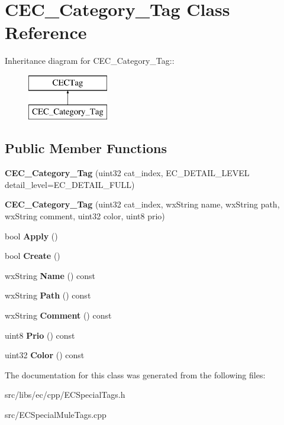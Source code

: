 \section{CEC\_\-Category\_\-Tag Class Reference}
\label{classCEC__Category__Tag}
Inheritance diagram for CEC\_\-Category\_\-Tag::\begin{figure}[H]
\begin{center}
\leavevmode
\includegraphics[height=2cm]{classCEC__Category__Tag}
\end{center}
\end{figure}
\subsection*{Public Member Functions}
\begin{DoxyCompactItemize}
\item 
{\bfseries CEC\_\-Category\_\-Tag} (uint32 cat\_\-index, EC\_\-DETAIL\_\-LEVEL detail\_\-level=EC\_\-DETAIL\_\-FULL)\label{classCEC__Category__Tag_a904f086f05f0ac6d945e6345faf9133e}

\item 
{\bfseries CEC\_\-Category\_\-Tag} (uint32 cat\_\-index, wxString name, wxString path, wxString comment, uint32 color, uint8 prio)\label{classCEC__Category__Tag_a2769cfc61a8cf20475986d538178af71}

\item 
bool {\bfseries Apply} ()\label{classCEC__Category__Tag_aa9d9e45e6d0c7bbbb65d001205af5311}

\item 
bool {\bfseries Create} ()\label{classCEC__Category__Tag_a3ac25165a92cb3155d680bac9f87b433}

\item 
wxString {\bfseries Name} () const \label{classCEC__Category__Tag_a227299f9e9d19461ee8ec809508978c2}

\item 
wxString {\bfseries Path} () const \label{classCEC__Category__Tag_a910fcc21849ebbb69dee39a6cc8a3cbe}

\item 
wxString {\bfseries Comment} () const \label{classCEC__Category__Tag_a8b317c6547094420002a4ba28621aebd}

\item 
uint8 {\bfseries Prio} () const \label{classCEC__Category__Tag_aded84f94ba61fbba87389f1fb81eacb5}

\item 
uint32 {\bfseries Color} () const \label{classCEC__Category__Tag_a383e80463f8fd091e320e4c2911a8e32}

\end{DoxyCompactItemize}


The documentation for this class was generated from the following files:\begin{DoxyCompactItemize}
\item 
src/libs/ec/cpp/ECSpecialTags.h\item 
src/ECSpecialMuleTags.cpp\end{DoxyCompactItemize}
